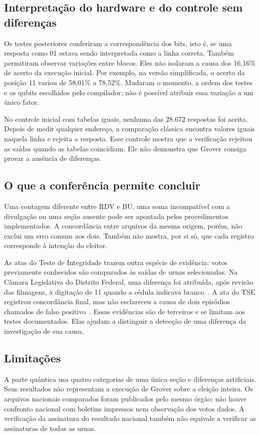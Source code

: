 \subsection{Interpretação do hardware e do controle sem diferenças}
Os testes posteriores conferiram a correspondência dos bits, isto é, se uma resposta como 01 estava sendo interpretada como a linha correta. Também permitiram observar variações entre blocos. Eles não isolaram a causa dos 16,16\% de acerto da execução inicial. Por exemplo, na versão simplificada, o acerto da posição 11 variou de 58,01\% a 78,52\%. Mudaram o momento, a ordem dos testes e os qubits escolhidos pelo compilador; não é possível atribuir essa variação a um único fator.

No controle inicial com tabelas iguais, nenhuma das 28.672 respostas foi aceita. Depois de medir qualquer endereço, a comparação clássica encontra valores iguais naquela linha e rejeita a resposta. Esse controle mostra que a verificação rejeitou as saídas quando as tabelas coincidiam. Ele não demonstra que Grover consiga provar a ausência de diferenças.

\subsection{O que a conferência permite concluir}
Uma contagem diferente entre RDV e BU, uma soma incompatível com a divulgação ou uma seção ausente pode ser apontada pelos procedimentos implementados. A concordância entre arquivos da mesma origem, porém, não exclui um erro comum aos dois. Também não mostra, por si só, que cada registro corresponde à intenção do eleitor.

As atas do Teste de Integridade trazem outra espécie de evidência: votos previamente conhecidos são comparados às saídas de urnas selecionadas. Na Câmara Legislativa do Distrito Federal, uma diferença foi atribuída, após revisão das filmagens, à digitação de 11 quando a cédula indicava branco~\cite{treDfAtaCldf2026}. A ata do TSE registrou concordância final, mas não esclareceu a causa de dois episódios chamados de falso positivo~\cite{treDfAtaTse2026}. Essas evidências são de terceiros e se limitam aos testes documentados. Elas ajudam a distinguir a detecção de uma diferença da investigação de sua causa.

\subsection{Limitações}
A parte quântica usa quatro categorias de uma única seção e diferenças artificiais. Seus resultados não representam a execução de Grover sobre a eleição inteira. Os arquivos nacionais comparados foram publicados pelo mesmo órgão; não houve confronto nacional com boletins impressos nem observação dos votos dados. A verificação da assinatura do resultado nacional também não equivale a verificar as assinaturas de todas as urnas.

